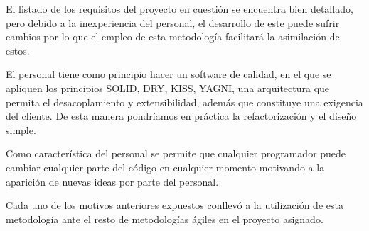 El listado de los requisitos del proyecto en cuestión se encuentra bien detallado, pero debido a la inexperiencia del personal, el desarrollo de este puede sufrir cambios por lo que el empleo de esta metodología facilitará la asimilación de estos. 

El personal tiene como principio hacer un software de calidad, en el que se apliquen los principios SOLID, DRY, KISS, YAGNI, una arquitectura que permita el desacoplamiento y extensibilidad, además que constituye una exigencia del cliente. De esta manera pondríamos en práctica la refactorización y el diseño simple.

Como característica del personal se permite que cualquier programador puede cambiar cualquier parte del código en cualquier momento motivando a la aparición de nuevas ideas por parte del personal. 

Cada uno de los motivos anteriores expuestos conllevó a la utilización de esta metodología ante el resto de metodologías ágiles en el proyecto asignado.

